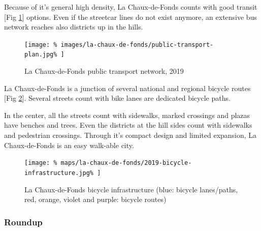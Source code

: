 \documentclass{article}
\begin{document}
\begin{multicols}{2}
			Because of it's general high density, La Chaux-de-Fonds counts with good transit [Fig \ref{fig:map:la-chaux-de-fonds-public-transport}] options. Even if the streetcar lines do not exist anymore, an extensive bus network reaches also districts up in the hills.
			
			
			
			\begin{figure}[H]
				\texttt{[image: \%
					images/la-chaux-de-fonds/public-transport-plan.jpg\%
				]}
				\caption{La Chaux-de-Fonds public transport network, 2019  \cite{TransN:LaChauxDeFonds}}
				\label{fig:map:la-chaux-de-fonds-public-transport}
			\end{figure}
			
			La Chaux-de-Fonds is a junction of several national and regional bicycle routes [Fig \ref{fig:map:la-chaux-de-fonds-bicycle-infrastructure}]. Several streets count with bike lanes are dedicated bicycle paths.
			
			In the center, all the streets count with sidewalks, marked crossings and plazas have benches and trees. Even the districts at the hill sides count with sidewalks and pedestrian crossings.
			Through it's compact design and limited expansion, La Chaux-de-Fonds is an easy walk-able city.
			
			\begin{figure}[H]
				\texttt{[image: \%
					maps/la-chaux-de-fonds/2019-bicycle-infrastructure.jpg\%
				]}
				\caption{La Chaux-de-Fonds bicycle infrastructure (blue: bicycle lanes/paths, red, orange, violet and purple: bicycle routes)  \cite{OpenCycleMap:LaChauxDeFonds}}
				\label{fig:map:la-chaux-de-fonds-bicycle-infrastructure}
			\end{figure}
			
			
			\subsubsection{Roundup}
			

\end{multicols}
\end{document}
